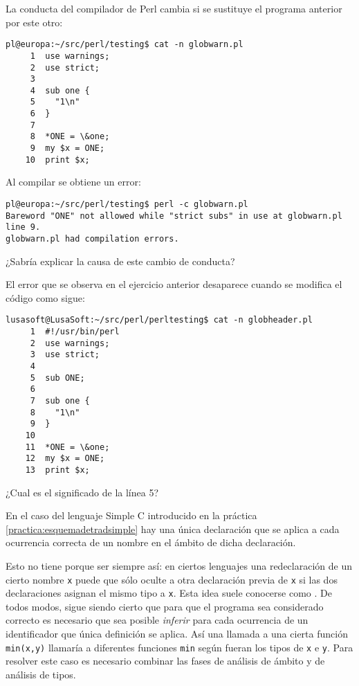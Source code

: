 \begin{exercise}
La conducta del compilador de Perl cambia si se sustituye el programa anterior por este otro:
\begin{verbatim}
pl@europa:~/src/perl/testing$ cat -n globwarn.pl
     1  use warnings;
     2  use strict;
     3
     4  sub one {
     5    "1\n"
     6  }
     7
     8  *ONE = \&one;
     9  my $x = ONE;
    10  print $x;
\end{verbatim}
Al compilar se obtiene un error:
\begin{verbatim}
pl@europa:~/src/perl/testing$ perl -c globwarn.pl
Bareword "ONE" not allowed while "strict subs" in use at globwarn.pl line 9.
globwarn.pl had compilation errors.
\end{verbatim}
¿Sabría explicar la causa de este cambio de conducta?
\end{exercise}

\begin{exercise}
El error que se observa en el ejercicio anterior desaparece 
cuando se modifica el código como sigue:
\begin{verbatim}
lusasoft@LusaSoft:~/src/perl/perltesting$ cat -n globheader.pl
     1  #!/usr/bin/perl
     2  use warnings;
     3  use strict;
     4
     5  sub ONE;
     6
     7  sub one {
     8    "1\n"
     9  }
    10
    11  *ONE = \&one;
    12  my $x = ONE;
    13  print $x;
\end{verbatim}
¿Cual es el significado de la línea 5?
\end{exercise}

En el caso del lenguaje Simple C introducido en la práctica 
\ref{practica:esquemadetradsimple}
hay una única declaración que se aplica a cada 
ocurrencia correcta de un nombre en el ámbito de dicha declaración.

Esto no tiene porque ser siempre así: en ciertos lenguajes 
una redeclaración de un cierto nombre \verb|x| puede que sólo oculte 
a otra declaración previa de \verb|x| si las dos declaraciones
asignan el mismo tipo a \verb|x|. Esta idea suele conocerse
como . De todos modos, sigue 
siendo cierto que para que el programa
sea considerado correcto es necesario que sea posible {\it inferir}
para cada ocurrencia de un identificador que única definición se
aplica. Así una llamada  a una cierta función
\verb|min(x,y)| llamaría a diferentes 
funciones \verb|min| según fueran los tipos de \verb|x| e \verb|y|.
Para resolver este caso es necesario combinar las fases
de análisis de ámbito y de análisis de tipos.

